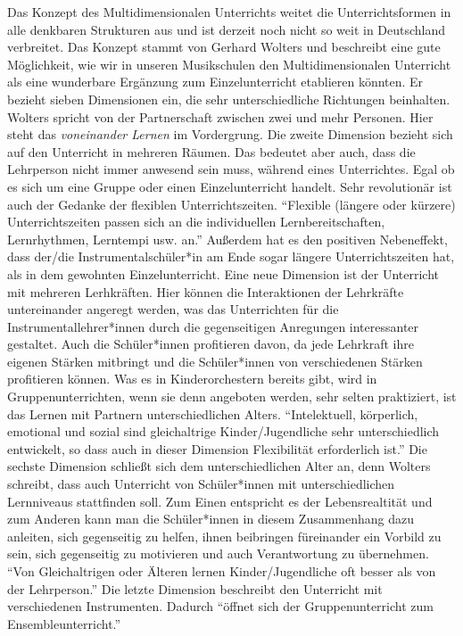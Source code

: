 Das Konzept des Multidimensionalen Unterrichts weitet die Unterrichtsformen in
alle denkbaren Strukturen aus und ist derzeit noch nicht so weit in Deutschland
verbreitet. Das Konzept stammt von Gerhard Wolters und beschreibt eine gute
Möglichkeit, wie wir in unseren Musikschulen den Multidimensionalen Unterricht
als eine wunderbare Ergänzung zum Einzelunterricht etablieren könnten. Er
bezieht sieben Dimensionen ein, die sehr unterschiedliche Richtungen beinhalten.
\autocite[86ff]{ernst:die_zukunftsfaehige_musikschule} Wolters spricht von der
Partnerschaft zwischen zwei und mehr Personen. Hier steht das \emph{voneinander Lernen}
im Vordergrung. Die zweite Dimension bezieht sich auf den Unterricht in mehreren
Räumen. Das bedeutet aber auch, dass die Lehrperson nicht immer anwesend sein
muss, während eines Unterrichtes. Egal ob es sich um eine Gruppe oder einen
Einzelunterricht handelt. Sehr revolutionär ist auch der Gedanke der flexiblen
Unterrichtszeiten. \enquote{Flexible (längere oder kürzere) Unterrichtszeiten
passen sich an die individuellen Lernbereitschaften, Lernrhythmen, Lerntempi
usw. an.} \autocite[87]{ernst:die_zukunftsfaehige_musikschule} Außerdem hat es
den positiven Nebeneffekt, dass der/die Instrumentalschüler*in am Ende sogar
längere Unterrichtszeiten hat, als in dem gewohnten Einzelunterricht. Eine neue
Dimension ist der Unterricht mit mehreren Lerhkräften. Hier können die
Interaktionen der Lehrkräfte untereinander angeregt werden, was das Unterrichten
für die Instrumentallehrer*innen durch die gegenseitigen Anregungen
interessanter gestaltet. Auch die Schüler*innen profitieren davon, da jede
Lehrkraft ihre eigenen Stärken mitbringt und die Schüler*innen von verschiedenen
Stärken profitieren können. Was es in Kinderorchestern bereits gibt, wird in
Gruppenunterrichten, wenn sie denn angeboten werden, sehr selten praktiziert,
ist das Lernen mit Partnern unterschiedlichen Alters. \enquote{Intelektuell,
körperlich, emotional und sozial sind gleichaltrige Kinder/Jugendliche sehr
unterschiedlich entwickelt, so dass auch in dieser Dimension Flexibilität
erforderlich ist.} \autocite[87]{ernst:die_zukunftsfaehige_musikschule} Die
sechste Dimension schließt sich dem unterschiedlichen Alter an, denn Wolters
schreibt, dass auch Unterricht von Schüler*innen mit unterschiedlichen
Lernniveaus stattfinden soll. Zum Einen entspricht es der Lebensrealtität und
zum Anderen kann man die Schüler*innen in diesem Zusammenhang dazu
anleiten, sich gegenseitig zu helfen, ihnen beibringen füreinander ein Vorbild
zu sein, sich gegenseitig zu motivieren und auch Verantwortung zu übernehmen.
\enquote{Von Gleichaltrigen oder Älteren lernen Kinder/Jugendliche oft besser
als von der Lehrperson.} \autocite[87]{ernst:die_zukunftsfaehige_musikschule}
Die letzte Dimension beschreibt den Unterricht mit verschiedenen Instrumenten.
Dadurch
\enquote{öffnet sich der Gruppenunterricht zum Ensembleunterricht.}
\autocite[87]{ernst:die_zukunftsfaehige_musikschule}

